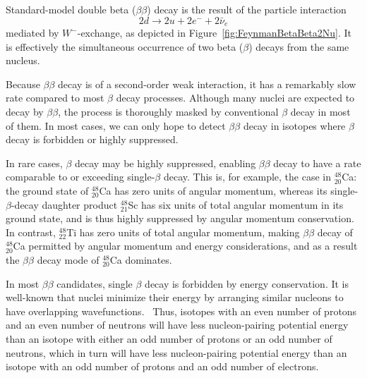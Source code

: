 Standard-model double beta ($\beta\beta$) decay is the result of the particle interaction
\begin{equation}\label{eqn:bb2n_decay_reaction}
2d \rightarrow 2u + 2e^- + 2\bar{\nu}_e
\end{equation}
mediated by $W^-$-exchange, as depicted in Figure~\ref{fig:FeynmanBetaBeta2Nu}.  It is effectively the simultaneous occurrence of two beta ($\beta$) decays from the same nucleus.

Because $\beta\beta$ decay is of a second-order weak interaction, it has a remarkably slow rate compared to most $\beta$ decay processes.  Although many nuclei are expected to decay by $\beta\beta$, the process is thoroughly masked by conventional $\beta$ decay in most of them.  In most cases, we can only hope to detect $\beta\beta$ decay in isotopes where $\beta$ decay is forbidden or highly suppressed.

In rare cases, $\beta$ decay may be highly suppressed, enabling $\beta\beta$ decay to have a rate comparable to or exceeding single-$\beta$ decay.  This is, for example, the case in $^{48}_{20}$Ca: the ground state of $^{48}_{20}$Ca has zero units of angular momentum, whereas its single-$\beta$-decay daughter product $^{48}_{21}$Sc has six units of total angular momentum in its ground state, and is thus highly suppressed by angular momentum conservation.  In contrast, $^{48}_{22}$Ti has zero units of total angular momentum, making $\beta\beta$ decay of $^{48}_{20}$Ca permitted by angular momentum and energy considerations, and as a result the $\beta\beta$ decay mode of $^{48}_{20}$Ca dominates.~\cite{MyNuclearPhysicsBook}

In most $\beta\beta$ candidates, single $\beta$ decay is forbidden by energy conservation.  It is well-known that nuclei minimize their energy by arranging similar nucleons to have overlapping wavefunctions.~\cite{MyNuclearPhysicsBook}  Thus, isotopes with an even number of protons and an even number of neutrons will have less nucleon-pairing potential energy than an isotope with either an odd number of protons or an odd number of neutrons, which in turn will have less nucleon-pairing potential energy than an isotope with an odd number of protons and an odd number of electrons.

